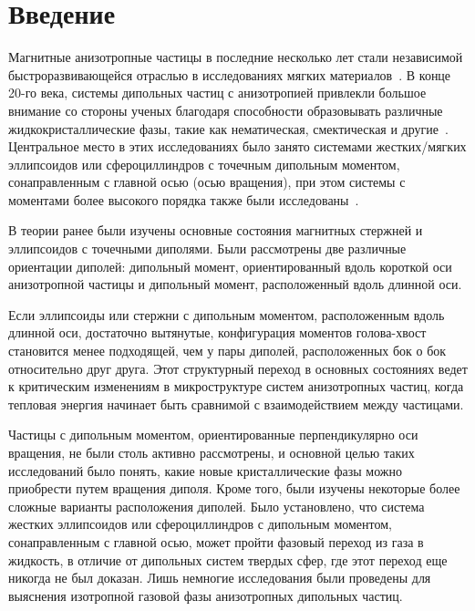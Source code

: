 \documentclass[a4paper,14pt]{extarticle}
\begin{document}
    

    \tableofcontents

    \newpage

    \section*{Введение}

    Магнитные анизотропные частицы в последние несколько лет стали независимой быстроразвивающейся отраслью в исследованиях мягких материалов~\cite{bib:three, bib:four, bib:five, bib:six}. В конце 20-го века, системы дипольных частиц с анизотропией привлекли большое внимание со стороны ученых благодаря способности образовывать различные жидкокристаллические фазы, такие как нематическая, смектическая и другие~\cite{bib:seven, bib:eight, bib:nine, bib:ten}. Центральное место в этих исследованиях было занято системами жестких/мягких эллипсоидов или сфероциллиндров с точечным дипольным моментом, сонаправленным с главной осью (осью вращения), при этом системы с моментами более высокого порядка также были исследованы~\cite{bib:one}.

    В теории ранее были изучены основные состояния магнитных стержней и эллипсоидов с точечными диполями. Были рассмотрены две различные ориентации диполей: дипольный момент, ориентированный вдоль короткой оси анизотропной частицы и дипольный момент, расположенный вдоль длинной оси.

    Если эллипсоиды или стержни с дипольным моментом, расположенным вдоль длинной оси, достаточно вытянутые, конфигурация моментов голова-хвост становится менее подходящей, чем у пары диполей, расположенных бок о бок относительно друг друга. Этот структурный переход в основных состояниях ведет к критическим изменениям в микроструктуре систем анизотропных частиц, когда тепловая энергия начинает быть сравнимой с взаимодействием между частицами.

    Частицы с дипольным моментом, ориентированные перпендикулярно оси вращения, не были столь активно рассмотрены, и основной целью таких исследований было понять, какие новые кристаллические фазы можно приобрести путем вращения диполя. Кроме того, были изучены некоторые более сложные варианты расположения диполей. Было установлено, что система жестких эллипсоидов или сфероциллиндров с дипольным моментом, сонаправленным с главной осью, может пройти фазовый переход из
    газа в жидкость, в отличие от дипольных систем твердых сфер, где этот
    переход еще никогда не был доказан. Лишь немногие исследования были проведены для выяснения изотропной газовой фазы анизотропных дипольных частиц.
\end{document}
